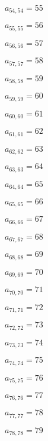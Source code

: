 \documentclass[a4paper,12pt]{article}
\begin{document}
$a _{ 54, 54 } = 55$

$a _{ 55, 55 } = 56$

$a _{ 56, 56 } = 57$

$a _{ 57, 57 } = 58$

$a _{ 58, 58 } = 59$

$a _{ 59, 59 } = 60$

$a _{ 60, 60 } = 61$

$a _{ 61, 61 } = 62$

$a _{ 62, 62 } = 63$

$a _{ 63, 63 } = 64$

$a _{ 64, 64 } = 65$

$a _{ 65, 65 } = 66$

$a _{ 66, 66 } = 67$

$a _{ 67, 67 } = 68$

$a _{ 68, 68 } = 69$

$a _{ 69, 69 } = 70$

$a _{ 70, 70 } = 71$

$a _{ 71, 71 } = 72$

$a _{ 72, 72 } = 73$

$a _{ 73, 73 } = 74$

$a _{ 74, 74 } = 75$

$a _{ 75, 75 } = 76$

$a _{ 76, 76 } = 77$

$a _{ 77, 77 } = 78$

$a _{ 78, 78 } = 79$
\end{document}
